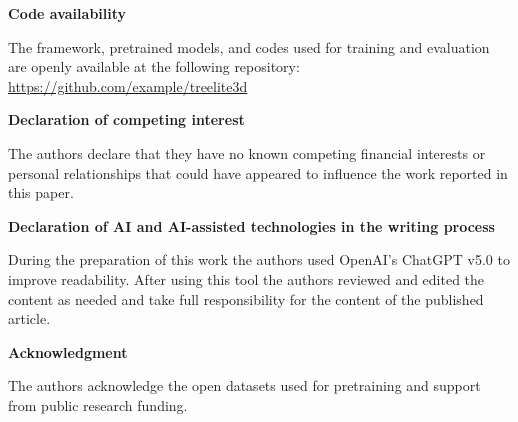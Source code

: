 \documentclass[review,authoryear]{elsarticle}
\begin{document}
\textbf{Code availability}

The framework, pretrained models, and codes used for training and evaluation are openly available at the following repository: \url{https://github.com/example/treelite3d}

\textbf{Declaration of competing interest}

The authors declare that they have no known competing financial interests or personal relationships that could have appeared to influence the work reported in this paper.

\textbf{Declaration of AI and AI-assisted technologies in the writing process}

During the preparation of this work the authors used OpenAI's ChatGPT v5.0 to improve readability. After using this tool the authors reviewed and edited the content as needed and take full responsibility for the content of the published article.

\textbf{Acknowledgment}

The authors acknowledge the open datasets used for pretraining and support from public research funding.


%


\clearpage
\end{document}
